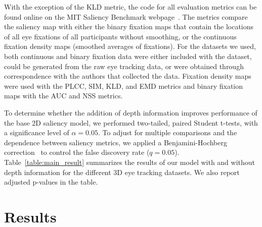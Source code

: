 With the exception of the KLD metric, the code for all evaluation metrics can be found online on the MIT Saliency Benchmark webpage~\citep{Judd_etal12}. The metrics compare the saliency map with either the binary fixation maps that contain the locations of all eye fixations of all participants without smoothing, or the continuous fixation density maps (smoothed averages of fixations). For the datasets we used, both continuous and binary fixation data were either included with the dataset, could be generated from the raw eye tracking data, or were obtained through correspondence with the authors that collected the data. Fixation density maps were used with the PLCC, SIM, KLD, and EMD metrics and binary fixation maps with the AUC and NSS metrics.

To determine whether the addition of depth information improves performance of the base 2D saliency model, we performed two-tailed, paired Student t-tests, with a significance level of $\alpha = 0.05.$ To adjust for multiple comparisons and the dependence between saliency metrics, we applied a Benjamini-Hochberg correction~\citep{Benjamini_Hochberg95} to control the false discovery rate ($q = 0.05$). Table~\ref{table:main_result} summarizes the results of our model with and without depth information for the different 3D eye tracking datasets. We also report adjusted p-values in the table.

\section{Results}


